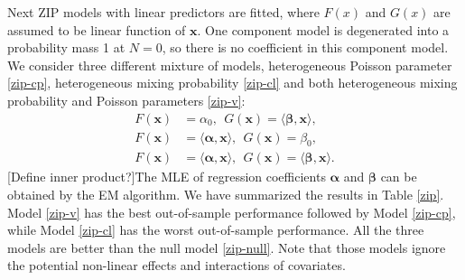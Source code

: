\documentclass[11pt]{article}
\numberwithin{equation}{section}
\def\bx{\boldsymbol{x}}
\begin{document}
Next ZIP models with linear predictors are fitted, where $F(x)$ and $G(x)$ are assumed to be linear function of $\bx$.
One component model is degenerated into a probability mass 1 at $N=0$, so there is no coefficient in this component model. 
We consider three different mixture of models, heterogeneous Poisson parameter  \eqref{zip-cp}, heterogeneous mixing probability \eqref{zip-cl} and both heterogeneous  mixing probability and Poisson parameters \eqref{zip-v}:
\begin{align}
	F(\bx)&=\alpha_0, ~~G(\bx)=\langle \boldsymbol{\beta}, \bx\rangle, \label{zip-cp} \\
	F(\bx)&=\langle \boldsymbol{\alpha},\bx\rangle, ~~G(\bx)=\beta_0, \label{zip-cl} \\
	F(\bx)&=\langle \boldsymbol{\alpha},\bx \rangle, ~~G(\bx)=\langle \boldsymbol{\beta}, \bx \rangle. \label{zip-v}
\end{align}  
{\color{blue}[Define inner product?]}The MLE of regression coefficients $\boldsymbol{\alpha}$ and $\boldsymbol{\beta}$ can be obtained by the EM algorithm.
We have summarized the results in Table \ref{zip}.
Model \eqref{zip-v} has the best out-of-sample performance followed by Model \eqref{zip-cp}, while Model \eqref{zip-cl} has the worst out-of-sample performance.
All the three models are better than the null model \eqref{zip-null}.
Note that those models ignore the potential non-linear effects and interactions of covariates.
\end{document}
